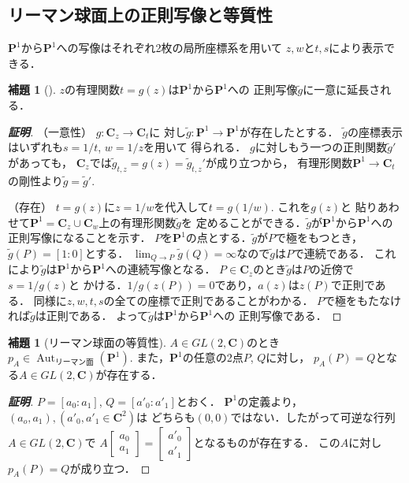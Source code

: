 \documentclass[11pt, a4paper, dvipdfmx, draft]{jsarticle}
\theoremstyle{definition}
\newtheorem{Lemma}[Axiom]{補題}
\newcommand{\cc}{\mathbf{C}}
\newcommand{\pp}{\mathbf{P}}
\newcommand{\Aut}{\mathop{\mathrm{Aut}}\nolimits}
\newcommand{\dip}{\displaystyle} %
\theoremstyle{mystyle}
\numberwithin{equation}{section} %
\begin{document}
\subsection{リーマン球面上の正則写像と等質性}

$\pp^1$から$\pp^1$への写像はそれぞれ2枚の局所座標系を用いて
$z,w$と$t,s$により表示できる．

\begin{Lemma}[{\cite[補題1.12]{ogs}}]\label{lem:contiP1}
    $z$の有理関数$t=g(z)$は$\pp^1$から$\pp^1$への
    正則写像$\widetilde{g}$に一意に延長される．
\end{Lemma}

\begin{proof}[\textbf{証明}]
    （一意性）
    $g\colon\cc_z\to\cc_t$に
    対し$\widetilde{g}\colon\pp^1\to\pp^1$が存在したとする．
    $\widetilde{g}$の座標表示はいずれも$s=1/t$, $w=1/z$を用いて
    得られる．
    $g$に対しもう一つの正則関数$\widetilde{g}'$があっても，
    $\cc_z$では$\widetilde{g}_{t,z}=g(z)
    =\widetilde{g}_{t,z}'$が成り立つから，
    有理形関数$\pp^1\to\cc_t$の剛性より$\widetilde{g}=\widetilde{g}'$. 

    （存在）
    $t=g(z)$に$z=1/w$を代入して$t=g(1/w)$. これを$g(z)$と
    貼りあわせて$\pp^1=\cc_z\cup\cc_w$上の有理形関数$\widetilde{g}$を
    定めることができる．$\widetilde{g}$が$\pp^1$から$\pp^1$への
    正則写像になることを示す．
    $P$を$\pp^1$の点とする．$\widetilde{g}$が$P$で極をもつとき，
    $\widetilde{g}(P)=[1\colon0]$とする．
    $\dip \lim_{Q\to P}\widetilde{g}(Q)=\infty$なので$\widetilde{g}$は$P$で連続である．
    これにより$\widetilde{g}$は$\pp^1$から$\pp^1$への連続写像となる．
    $P\in\cc_z$のとき$\widetilde{g}$は$P$の近傍で$s=1/g(z)$と
    かける．$1/g(z(P))=0$であり，$a(z)$は$z(P)$で正則である．
    同様に$z, w, t, s$の全ての座標で正則であることがわかる．
    $P$で極をもたなければ$\widetilde{g}$は正則である．
    よって$\widetilde{g}$は$\pp^1$から$\pp^1$への
    正則写像である．
\end{proof}

\begin{Lemma}[リーマン球面の等質性{\cite[補題1.13]{ogs}}]
    $A\in GL(2,\cc)$のとき
    $p_A \in \Aut_{\text{リーマン面}}(\pp^1)$. 
    また，$\pp^1$の任意の2点$P$, $Q$に対し，
    $p_A(P)=Q$となる$A\in GL(2,\cc)$が存在する．
\end{Lemma}

\begin{proof}[\textbf{証明}]
    $P=[a_0\colon a_1]$, $Q=[a'_0\colon a'_1]$とおく．
    $\pp^1$の定義より，$(a_o,a_1), (a'_0,a'_1\in\cc^2)$は
    どちらも$(0,0)$ではない．したがって可逆な行列$A\in GL(2,\cc)$で
    $A\begin{bmatrix}
        a_0\\a_1
    \end{bmatrix}=\begin{bmatrix}
        a'_0\\a'_1
    \end{bmatrix}$となるものが存在する．
    この$A$に対し$p_A(P)=Q$が成り立つ．
\end{proof}
\end{document}
